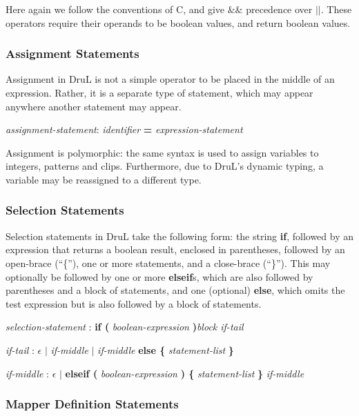 Here again we follow the conventions of C, and give $\&\&$ precedence over $||$.  These operators require their operands to be boolean values, and return boolean values.

\subsubsection{Assignment Statements}

Assignment in DruL is not a simple operator to be placed in the middle of an expression.  Rather, it is a separate type of statement, which may appear anywhere another statement may appear.  

\begin{center}
\emph{assignment-statement}: \emph{identifier} \textbf{=}  \emph{expression-statement}
\end{center}

Assignment is polymorphic: the same syntax is used to assign variables to
integers, patterns and clips. Furthermore, due to DruL's dynamic typing,
a variable may be reassigned to a different type.

\subsubsection{Selection Statements}

Selection statements in DruL take the following form: the string \textbf{if}, followed by an expression that returns a boolean result, enclosed in parentheses, followed by an open-brace (``\{''), one or more statements, and a close-brace (``\}'').  This may optionally be followed by one or more \textbf{elseif}s, which are also followed by parentheses and a block of statements, and one (optional) \textbf{else}, which omits the test expression but is also followed by a block of statements.

\emph{selection-statement} : \textbf{if ( } \emph{boolean-expression} \textbf{ )}\emph{block if-tail}

\emph{if-tail} : $\epsilon$ $|$ \emph{if-middle} $|$
	\emph{if-middle} \textbf{else \{} \emph{statement-list} \textbf{\}} 

\emph{if-middle} : $\epsilon$ $|$   \textbf{elseif ( } \emph{boolean-expression} \textbf{ ) \{} \emph{statement-list} \textbf{\}} \emph{if-middle} 

\subsubsection{Mapper Definition Statements}\label{MapperDefinitionStatement}

